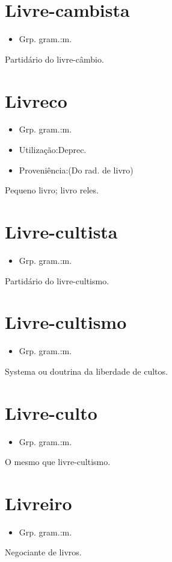 \section{Livre-cambista}
\begin{itemize}
\item {Grp. gram.:m.}
\end{itemize}
Partidário do livre-câmbio.
\section{Livreco}
\begin{itemize}
\item {Grp. gram.:m.}
\end{itemize}
\begin{itemize}
\item {Utilização:Deprec.}
\end{itemize}
\begin{itemize}
\item {Proveniência:(Do rad. de \textunderscore livro\textunderscore )}
\end{itemize}
Pequeno livro; livro reles.
\section{Livre-cultista}
\begin{itemize}
\item {Grp. gram.:m.}
\end{itemize}
Partidário do livre-cultismo.
\section{Livre-cultismo}
\begin{itemize}
\item {Grp. gram.:m.}
\end{itemize}
Systema ou doutrina da liberdade de cultos.
\section{Livre-culto}
\begin{itemize}
\item {Grp. gram.:m.}
\end{itemize}
O mesmo que \textunderscore livre-cultismo\textunderscore .
\section{Livreiro}
\begin{itemize}
\item {Grp. gram.:m.}
\end{itemize}
Negociante de livros.
